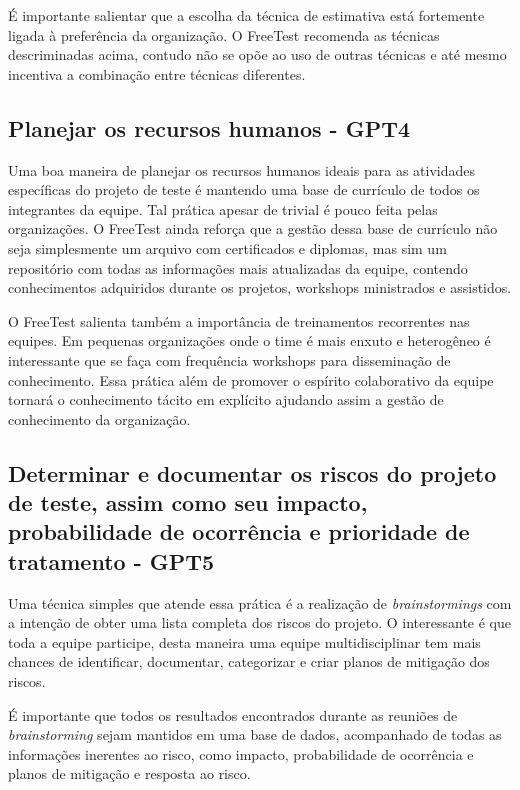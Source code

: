 É importante salientar que a escolha da técnica de estimativa está fortemente ligada à preferência da organização. O FreeTest recomenda as técnicas descriminadas acima, contudo não se opõe ao uso de outras técnicas e até mesmo incentiva a combinação entre técnicas diferentes.

\subsection{Planejar os recursos humanos - GPT4}
\label{sec:guiagpt4}

Uma boa maneira de planejar os recursos humanos ideais para as atividades específicas do projeto de teste é mantendo uma base de currículo de todos os integrantes da equipe. Tal prática apesar de trivial é pouco feita pelas organizações. O FreeTest ainda reforça que a gestão dessa base de currículo não seja simplesmente um arquivo com certificados e diplomas, mas sim um repositório com todas as informações mais atualizadas da equipe, contendo conhecimentos adquiridos durante os projetos, workshops ministrados e assistidos.

O FreeTest salienta também a importância de treinamentos recorrentes nas equipes. Em pequenas organizações onde o time é mais enxuto e heterogêneo é interessante que se faça com frequência workshops para disseminação de conhecimento. Essa prática além de promover o espírito colaborativo da equipe tornará o conhecimento tácito em explícito ajudando assim a gestão de conhecimento da organização.

\subsection{Determinar e documentar os riscos do projeto de teste, assim como seu impacto, probabilidade de ocorrência e prioridade de tratamento - GPT5}
\label{sec:guiagpt5}

Uma técnica simples que atende essa prática é a realização de \textit{brainstormings} com a intenção de obter uma lista completa dos riscos do projeto. O interessante é que toda a equipe participe, desta maneira uma equipe multidisciplinar tem mais chances de identificar, documentar, categorizar e criar planos de mitigação dos riscos.

É importante que todos os resultados encontrados durante as reuniões de \textit{brainstorming} sejam mantidos em uma base de dados, acompanhado de todas as informações inerentes ao risco, como impacto, probabilidade de ocorrência e planos de mitigação e resposta ao risco.

